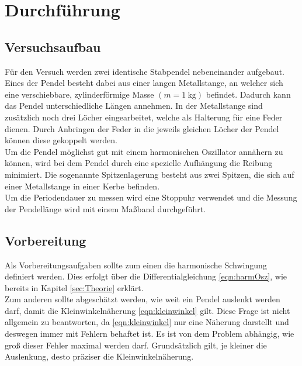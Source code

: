 \section{Durchführung}
\label{sec:Durchführung}
\subsection{Versuchsaufbau}
Für den Versuch werden zwei identische Stabpendel nebeneinander aufgebaut. Eines der Pendel besteht dabei aus einer langen Metallstange, an welcher sich eine
verschiebbare, zylinderförmige Masse $(m=\SI{1}{\kilo\gram})$ befindet. Dadurch kann das Pendel unterschiedliche Längen annehmen. In der Metallstange sind zusätzlich
noch drei Löcher eingearbeitet, welche als Halterung für eine Feder dienen. Durch Anbringen der Feder in die jeweils gleichen Löcher der Pendel können diese
gekoppelt werden.
\\
Um die Pendel möglichst gut mit einem harmonischen Oszillator annähern zu können, wird bei dem Pendel durch eine spezielle Aufhängung die Reibung minimiert.
Die sogenannte Spitzenlagerung besteht aus zwei Spitzen, die sich auf einer Metallstange in einer Kerbe befinden.
\\
Um die Periodendauer zu messen wird eine Stoppuhr verwendet und die Messung der Pendellänge wird mit einem Maßband durchgeführt.
\subsection{Vorbereitung}
\label{sec:Vorbereitung}
Als Vorbereitungsaufgaben sollte zum einen die harmonische Schwingung definiert werden. Dies erfolgt über die Differentialgleichung
\eqref{eqn:harmOsz}, wie bereits in Kapitel \ref{sec:Theorie} erklärt.
\\
Zum anderen sollte  abgeschätzt werden, wie weit ein Pendel auslenkt werden darf, damit die Kleinwinkelnäherung \eqref{eqn:kleinwinkel}
gilt. Diese Frage ist nicht allgemein zu beantworten, da \eqref{eqn:kleinwinkel} nur eine Näherung darstellt und deswegen immer
mit Fehlern behaftet ist. Es ist von dem Problem abhängig, wie groß dieser Fehler maximal werden darf. Grundsätzlich gilt, je kleiner
die Auslenkung, desto präziser die Kleinwinkelnäherung.

